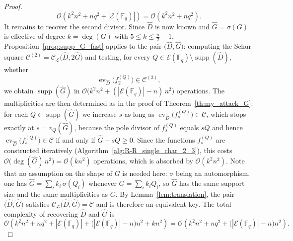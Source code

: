 \documentclass[sn-mathphys-num]{sn-jnl_modified}
\newcommand{\FF}{\ensuremath{\mathbb{F}}}
\begin{document}
\begin{proof}
\[
\mathcal{O}\!\left(k^2n^2+nq^2+|\mathcal{E}(\FF_q)|\right)=\mathcal{O}\!\left(k^2n^2+nq^2\right).
\]
It remains to recover the second divisor. Since $\widehat{D}$ is now known and $\widehat{G} = \sigma(G)$ is effective of degree $k = \deg(G)$ with $5 \leq k \leq \frac{n}{2}-1$, Proposition~\ref{prop:supp_G_fast} applies to the pair $\bigl(\widehat{D}, \widehat{G}\bigr)$: computing the Schur square $\mathcal{C}^{(2)} = \mathcal{C}_\mathscr{L}\bigl(\widehat{D}, 2\widehat{G}\bigr)$ and testing, for every $Q \in \mathcal{E}(\FF_q) \setminus \operatorname{supp}(\widehat{D})$, whether
\[
\operatorname{ev}_{\widehat{D}}\bigl(f_2^{(Q)}\bigr) \in \mathcal{C}^{(2)},
\]
we obtain $\operatorname{supp}(\widehat{G})$ in $\mathcal{O}\bigl(k^2n^2 + (|\mathcal{E}(\FF_q)|-n)\,n^2\bigr)$ operations. The multiplicities are then determined as in the proof of Theorem~\ref{th:my_attack_G}: for each $Q \in \operatorname{supp}(\widehat{G})$ we increase $s$ as long as $\operatorname{ev}_{\widehat{D}}\bigl(f_s^{(Q)}\bigr) \in \mathcal{C}$, which stops exactly at $s = v_Q(\widehat{G})$, because the pole divisor of $f_s^{(Q)}$ equals $sQ$ and hence $\operatorname{ev}_{\widehat{D}}\bigl(f_s^{(Q)}\bigr) \in \mathcal{C}$ if and only if $\widehat{G} - sQ \geq 0$. Since the functions $f_s^{(Q)}$ are constructed iteratively (Algorithm~\ref{alg:R-R_single_char_2_3}), this costs $\mathcal{O}\bigl(\deg(\widehat{G})\,n^2\bigr) = \mathcal{O}(k n^2)$ operations, which is absorbed by $\mathcal{O}(k^2n^2)$. Note that no assumption on the shape of $G$ is needed here: $\sigma$ being an automorphism, one has $\widehat{G} = \sum_i k_i\,\sigma(Q_i)$ whenever $G = \sum_i k_i Q_i$, so $\widehat{G}$ has the same support size and the same multiplicities as $G$. By Lemma~\ref{lem:translation}, the pair $\bigl(\widehat{D}, \widehat{G}\bigr)$ satisfies $\mathcal{C}_\mathscr{L}\bigl(\widehat{D},\widehat{G}\bigr) = \mathcal{C}$ and is therefore an equivalent key. The total complexity of recovering $\widehat{D}$ and $\widehat{G}$ is
\[
\mathcal{O}\!\left(k^2n^2 + nq^2 + |\mathcal{E}(\FF_q)| + \bigl(|\mathcal{E}(\FF_q)|-n\bigr)n^2 + kn^2\right) = \mathcal{O}\!\left(k^2n^2 + nq^2 + \bigl(|\mathcal{E}(\FF_q)|-n\bigr)n^2\right).
\]
\end{proof}
\end{document}
